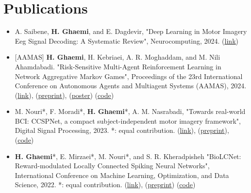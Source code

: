 \documentclass[A4,11pt]{article}
\makeatletter
\newcommand{\CVItem}[1]{
  \item\small{
    {#1 \vspace{-2pt}}
  }
}
\newcommand{\CVSubheading}[4]{
  \vspace{-2pt}\item
    \begin{tabular*}{0.97\textwidth}[t]{l@{\extracolsep{\fill}}r}
      \textbf{#1} & #2 \\
      \small#3 & \small #4 \\
    \end{tabular*}\vspace{-7pt}
}
\newcommand{\CVItemListStart}{\begin{itemize}}
\newcommand{\CVItemListEnd}{\end{itemize}\vspace{-5pt}}
\makeatother
\begin{document}

\section{Publications}
\CVItemListStart
\CVItem{A. Saibene, \textbf{H. Ghaemi}, and E. Dagdevir, "Deep Learning in Motor Imagery Eeg Signal Decoding: A Systematic Review", Neurocomputing, 2024. (\href{https://www.sciencedirect.com/science/article/abs/pii/S0925231224013481}{\underline{link}})}

\CVItem{[AAMAS] \textbf{H. Ghaemi}, H. Kebriaei, A. R. Moghaddam, and M. Nili Ahamdabadi. "Risk-Sensitive Multi-Agent Reinforcement Learning in Network Aggregative Markov Games", Proceedings of the 23rd International Conference on Autonomous Agents and Multiagent Systems (AAMAS), 2024. (\href{https://dl.acm.org/doi/10.5555/3635637.3663134}{\underline{link}}), (\href{https://arxiv.org/abs/2402.05906}{\underline{preprint}}), (\href{https://github.com/hafezgh/risk-sensitive-marl-namg/blob/main/Poster_RSMARL_AAMAS2024.pdf}{\underline{poster}}) (\href{https://github.com/hafezgh/risk-sensitive-marl-namg/}{\underline{code}})}

\CVItem{M. Nouri*, F. Moradi*, \textbf{H. Ghaemi}*, A. M. Nasrabadi, "Towards real-world BCI: CCSPNet, a compact subject-independent motor imagery framework", Digital Signal Processing, 2023. *: equal contribution. (\href{https://doi.org/10.1016/j.dsp.2022.103816}{\underline{link}}), (\href{https://arxiv.org/abs/2012.13567}{\underline{preprint}}), (\href{https://github.com/Singular-Brain/CCSPNet}{\underline{code}})}

\CVItem{\textbf{H. Ghaemi}*, E. Mirzaei*, M. Nouri*, and S. R. Kheradpisheh "BioLCNet: Reward-modulated Locally Connected Spiking Neural Networks", International Conference on Machine Learning, Optimization, and Data Science, 2022. *: equal contribution. (\href{https://doi.org/10.1007/978-3-031-25891-6_42}{\underline{link}}), (\href{https://arxiv.org/abs/2109.05539}{\underline{preprint}}) (\href{https://github.com/Singular-Brain/BioLCNet}{\underline{code}})}


\CVItemListEnd
\end{document}
